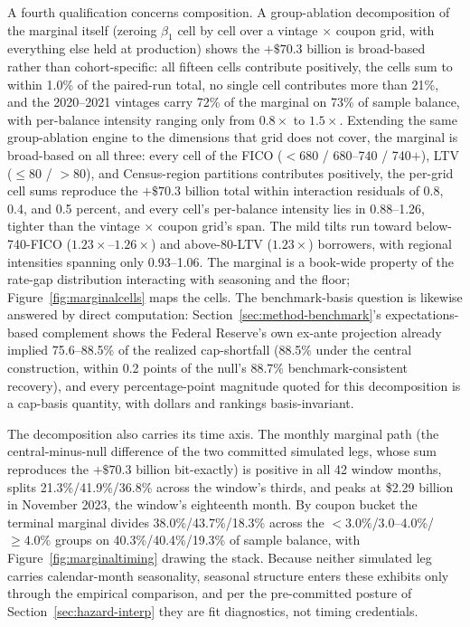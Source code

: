 \documentclass[12pt]{article}
\begin{document}
A fourth qualification concerns composition. A group-ablation decomposition of the marginal itself (zeroing $\beta_1$ cell by cell over a vintage $\times$ coupon grid, with everything else held at production) shows the $+\$70.3$ billion is broad-based rather than cohort-specific: all fifteen cells contribute positively, the cells sum to within 1.0\% of the paired-run total, no single cell contributes more than 21\%, and the 2020--2021 vintages carry 72\% of the marginal on 73\% of sample balance, with per-balance intensity ranging only from $0.8\times$ to $1.5\times$. Extending the same group-ablation engine to the dimensions that grid does not cover, the marginal is broad-based on all three: every cell of the FICO ($<$680 / 680--740 / 740$+$), LTV ($\leq$80 / $>$80), and Census-region partitions contributes positively, the per-grid cell sums reproduce the $+\$70.3$ billion total within interaction residuals of 0.8, 0.4, and 0.5 percent, and every cell's per-balance intensity lies in 0.88--1.26, tighter than the vintage $\times$ coupon grid's span. The mild tilts run toward below-740-FICO ($1.23\times$--$1.26\times$) and above-80-LTV ($1.23\times$) borrowers, with regional intensities spanning only 0.93--1.06. The marginal is a book-wide property of the rate-gap distribution interacting with seasoning and the floor; Figure~\ref{fig:marginalcells} maps the cells. The benchmark-basis question is likewise answered by direct computation: Section~\ref{sec:method-benchmark}'s expectations-based complement shows the Federal Reserve's own ex-ante projection already implied 75.6--88.5\% of the realized cap-shortfall (88.5\% under the central construction, within 0.2 points of the null's 88.7\% benchmark-consistent recovery), and every percentage-point magnitude quoted for this decomposition is a cap-basis quantity, with dollars and rankings basis-invariant.

The decomposition also carries its time axis. The monthly marginal path (the central-minus-null difference of the two committed simulated legs, whose sum reproduces the $+\$70.3$ billion bit-exactly) is positive in all 42 window months, splits 21.3\%/41.9\%/36.8\% across the window's thirds, and peaks at \$2.29 billion in November 2023, the window's eighteenth month. By coupon bucket the terminal marginal divides 38.0\%/43.7\%/18.3\% across the $<3.0\%$/3.0--4.0\%/$\geq 4.0\%$ groups on 40.3\%/40.4\%/19.3\% of sample balance, with Figure~\ref{fig:marginaltiming} drawing the stack. Because neither simulated leg carries calendar-month seasonality, seasonal structure enters these exhibits only through the empirical comparison, and per the pre-committed posture of Section~\ref{sec:hazard-interp} they are fit diagnostics, not timing credentials.
\end{document}
